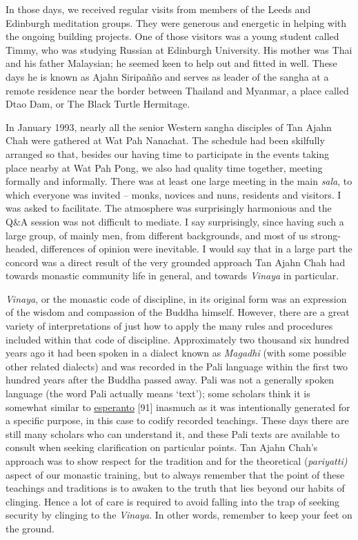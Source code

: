 In those days, we received regular visits from members of the Leeds and
Edinburgh meditation groups. They were generous and energetic in helping
with the ongoing building projects. One of those visitors was a young
student called Timmy, who was studying Russian at Edinburgh University.
His mother was Thai and his father Malaysian; he seemed keen to help out
and fitted in well. These days he is known as Ajahn Siripañño and serves
as leader of the sangha at a remote residence near the border between
Thailand and Myanmar, a place called Dtao Dam, or The Black Turtle
Hermitage.

In January 1993, nearly all the senior Western sangha disciples of Tan
Ajahn Chah were gathered at Wat Pah Nanachat. The schedule had been
skilfully arranged so that, besides our having time to participate in
the events taking place nearby at Wat Pah Pong, we also had quality time
together, meeting formally and informally. There was at least one large
meeting in the main \emph{sala}, to which everyone was invited -- monks,
novices and nuns, residents and visitors. I was asked to facilitate. The
atmosphere was surprisingly harmonious and the Q\&A session was not
difficult to mediate. I say surprisingly, since having such a large
group, of mainly men, from different backgrounds, and most of us
strong-headed, differences of opinion were inevitable. I would say that
in a large part the concord was a direct result of the very grounded
approach Tan Ajahn Chah had towards monastic community life in general,
and towards \emph{Vinaya} in particular.

\emph{Vinaya}, or the monastic code of discipline, in its original form
was an expression of the wisdom and compassion of the Buddha himself.
However, there are a great variety of interpretations of just how to
apply the many rules and procedures included within that code of
discipline. Approximately two thousand six hundred years ago it had been
spoken in a dialect known as \emph{Magadhi} (with some possible other
related dialects) and was recorded in the Pali language within the first
two hundred years after the Buddha passed away. Pali was not a generally
spoken language (the word Pali actually means `text'); some scholars
think it is somewhat similar to
\href{https://en.wikipedia.org/wiki/Esperanto}{\underline{esperanto}}
{[}91{]} inasmuch as it was intentionally generated for a specific
purpose, in this case to codify recorded teachings. These days there are
still many scholars who can understand it, and these Pali texts are
available to consult when seeking clarification on particular points.
Tan Ajahn Chah's approach was to show respect for the tradition and for
the theoretical (\emph{pariyatti)} aspect of our monastic training, but
to always remember that the point of these teachings and traditions is
to awaken to the truth that lies beyond our habits of clinging. Hence a
lot of care is required to avoid falling into the trap of seeking
security by clinging to the \emph{Vinaya}. In other words, remember to
keep your feet on the ground.

